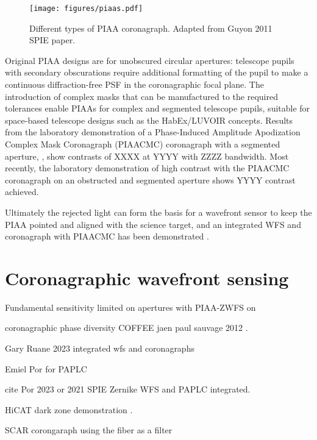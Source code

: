 \documentclass[letterpaper]{ar-1col}
\begin{document}
\begin{figure}[ht]
  \centering
  \texttt{[image: figures/piaas.pdf]}
  \caption{Different types of PIAA coronagraph. Adapted from Guyon 2011 SPIE paper.}
  \label{fig:piaatypes}
\end{figure}

%
Original PIAA designs are for unobscured circular apertures: telescope pupils with secondary obscurations require additional formatting of the pupil to make a continuous diffraction-free PSF in the coronagraphic focal plane.
%
The introduction of complex masks that can be manufactured to the required tolerances enable PIAAs for complex and segmented telescope pupils, suitable for space-based telescope designs such as the HabEx/LUVOIR concepts.
%
Results from the laboratory demonstration of a Phase-Induced Amplitude Apodization Complex Mask Coronagraph (PIAACMC) coronagraph with a segmented aperture, \citep{Marx21}, show contrasts of XXXX at YYYY with ZZZZ bandwidth.
%
Most recently, the laboratory demonstration of high contrast with the PIAACMC coronagraph on an obstructed and segmented aperture \citep{Belikov22} shows YYYY contrast achieved.

Ultimately the rejected light can form the basis for a wavefront sensor to keep the PIAA pointed and aligned with the science target, and an integrated WFS and coronagraph with PIAACMC has been demonstrated \citep{Haffert23a}.

\section{Coronagraphic wavefront sensing}


Fundamental sensitivity limited on apertures with PIAA-ZWFS on \citet{Haffert23}

coronagraphic phase diversity
COFFEE jaen paul sauvage 2012 \citep{Sauvage12}.


Gary Ruane 2023 integrated wfs and coronagraphs \citep{Ruane23}

Emiel Por for PAPLC \citep{Por20}

cite Por 2023 or 2021 SPIE Zernike WFS and PAPLC integrated. \citep{Pourcelot22,Pourcelot23}

HiCAT dark zone demonstration \citep{Soummer22}.

SCAR corongaraph using the fiber as a filter \citep{Haffert20}
\end{document}
